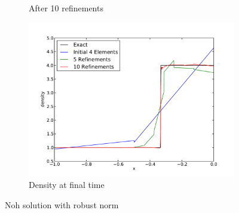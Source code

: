 \documentclass[Dissertation.tex]{subfiles}
\begin{document}
\begin{figure}[!ht]
\begin{subfigure}[t]{0.32\textwidth}
\caption{After 10 refinements}
\end{subfigure}
\begin{subfigure}[t]{0.9\textwidth}
\centering
\includegraphics[width=\textwidth]{Dissertation/Noh/Robust-den.pdf}
\caption{Density at final time}
\end{subfigure}
\caption{Noh solution with robust norm}
\label{fig:NohRobust}
\end{figure}
\end{document}
